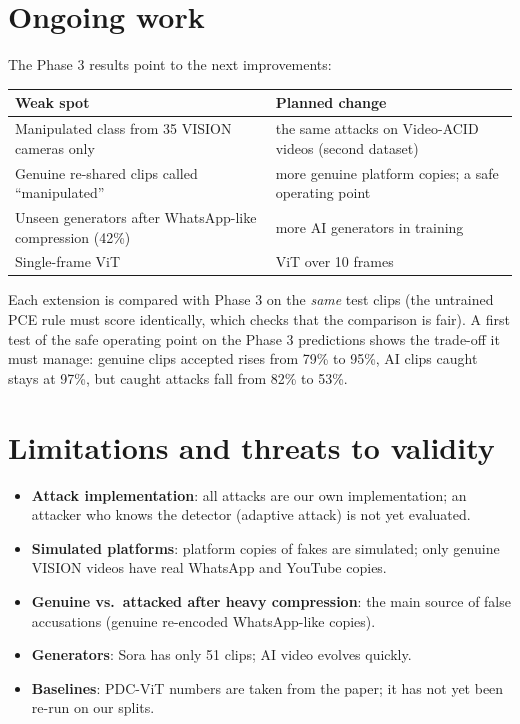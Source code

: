 \documentclass[11pt,a4paper]{article}
\begin{document}
\section{Ongoing work}\label{sec:ongoing}
The Phase 3 results point to the next improvements:
\begin{table}[H]\centering\small
\begin{tabularx}{\linewidth}{lY}\toprule
Weak spot & Planned change \\\midrule
Manipulated class from 35 VISION cameras only & the same attacks on Video-ACID videos (second dataset) \\
Genuine re-shared clips called ``manipulated'' & more genuine platform copies; a safe operating point \\
Unseen generators after WhatsApp-like compression (42\%) & more AI generators in training \\
Single-frame ViT & ViT over 10 frames \\\bottomrule
\end{tabularx}\end{table}
Each extension is compared with Phase 3 on the \emph{same} test clips (the untrained PCE rule must score identically, which
checks that the comparison is fair). A first test of the safe operating point on the Phase 3 predictions shows the trade-off
it must manage: genuine clips accepted rises from 79\% to 95\%, AI clips caught stays at 97\%, but caught attacks fall from
82\% to 53\%.

\section{Limitations and threats to validity}
\begin{itemize}
\item \textbf{Attack implementation}: all attacks are our own implementation; an attacker who knows the detector (adaptive
      attack) is not yet evaluated.
\item \textbf{Simulated platforms}: platform copies of fakes are simulated; only genuine VISION videos have real WhatsApp and
      YouTube copies.
\item \textbf{Genuine vs.\ attacked after heavy compression}: the main source of false accusations (genuine re-encoded
      WhatsApp-like copies).
\item \textbf{Generators}: Sora has only 51 clips; AI video evolves quickly.
\item \textbf{Baselines}: PDC-ViT numbers are taken from the paper; it has not yet been re-run on our splits.
\end{itemize}
\end{document}
